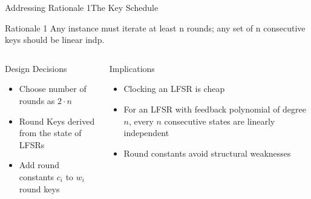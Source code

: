 \begin{frame}{Addressing Rationale 1}{The Key Schedule}
    \hspace*{-8.5pt}
    \begin{minipage}{1.0145\textwidth}
    \begin{exampleblock}{Rationale 1}
        Any instance must iterate at least n rounds; any set of n consecutive keys should be linear indp.
    \end{exampleblock}
    \end{minipage}
    \begin{columns}
        \begin{column}{0.49\textwidth}
            \begin{block}{Design Decisions}
                \begin{itemize}
                    \item Choose number of rounds as $2 \cdot n$\\[5pt]
                    \item Round Keys derived from the state of LFSRs\\[5pt]
                    \item Add round constants $c_i$ to $w_i$ round keys
                \end{itemize}
                \vspace{30pt}
            \end{block}
        \end{column}
        \begin{column}{0.49\textwidth}
            \begin{block}{Implications}
                \begin{itemize}
                    \item Clocking an LFSR is cheap
                    \item For an LFSR with feedback polynomial of degree $n$, every $n$ consecutive states are linearly independent
                    \item Round constants avoid structural weaknesses
                \end{itemize}
            \end{block}
        \end{column}
    \end{columns}
\end{frame}

